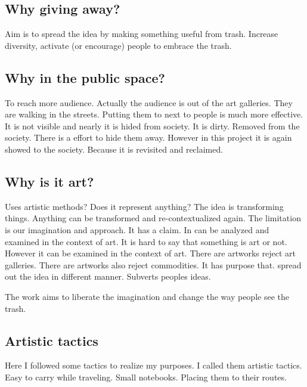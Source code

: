 \subsection{Why giving away?}
Aim is to spread the idea by making something useful from trash. Increase diversity, activate (or encourage) people to embrace the trash.

\subsection{Why in the public space?}
To reach more audience. Actually the audience is out of the art galleries. They are walking in the streets. Putting them to next to people is much more effective. It is not visible and nearly it is hided from society. It is dirty. Removed from the society. There is a effort to hide them away. However in this project it is again showed to the society. Because it is revisited and reclaimed. 

\subsection{Why is it art?}
Uses artistic methods? Does it represent anything? The idea is transforming things. Anything can be transformed and re-contextualized again. The limitation is our imagination and approach. It has a claim. In can be analyzed and examined in the context of art. It is hard to say that something is art or not. However it can be examined in the context of art. There are artworks reject art galleries. There are artworks also reject commodities. It has purpose that. spread out the idea in different manner. Subverts peoples ideas. 

The work aims to liberate the imagination and change the way people see the trash.

\subsection{Artistic tactics}
Here I followed some tactics to realize my purposes. I called them artistic tactics. Easy to carry while traveling. Small notebooks. Placing them to their routes. 
